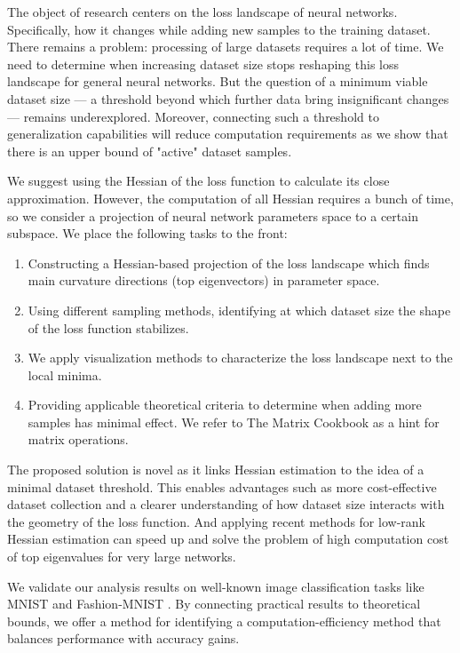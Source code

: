 \documentclass{article}
\begin{document}
The object of research centers on the loss landscape of neural networks. Specifically, how it changes while adding new samples
to the training dataset. There remains a problem: processing of large datasets requires a lot of time.
We need to determine when increasing dataset size stops reshaping this loss landscape for general neural networks.
But the question of a minimum viable dataset size --- a threshold beyond which further data bring insignificant changes ---
remains underexplored. Moreover, connecting such a threshold to generalization capabilities \cite{wu2017towards} will
reduce computation requirements as we show that there is an upper bound of "active" dataset samples.

We suggest using the Hessian of the loss function to calculate its close approximation. However, the computation of all
Hessian requires a bunch of time, so we consider a projection of neural network parameters space to a certain subspace.
We place the following tasks to the front:
\begin{enumerate}
  \item Constructing a Hessian-based projection of the loss landscape which finds main curvature directions
        (top eigenvectors) in parameter space.
  \item Using different sampling methods, identifying at which dataset size the shape of the loss function stabilizes.
  \item We apply visualization methods to characterize the loss landscape next to the local minima.
  \item Providing applicable theoretical criteria to determine when adding more samples has minimal effect.
        We refer to The Matrix Cookbook \cite{petersen2012matrix} as a hint for matrix operations.
\end{enumerate}

The proposed solution is novel as it links Hessian estimation to the idea of a minimal dataset threshold. This enables
advantages such as more cost-effective dataset collection and a clearer understanding of how dataset size interacts with the
geometry of the loss function. And applying recent methods for low-rank Hessian estimation
can speed up and solve the problem of high computation cost of top eigenvalues for very large networks.

We validate our analysis results on well-known image classification tasks like MNIST \cite{deng2012mnist} and Fashion-MNIST
\cite{xiao2017fashion}. By connecting practical results to theoretical bounds, we offer a method for identifying
a computation-efficiency method that balances performance with accuracy gains.
\end{document}
